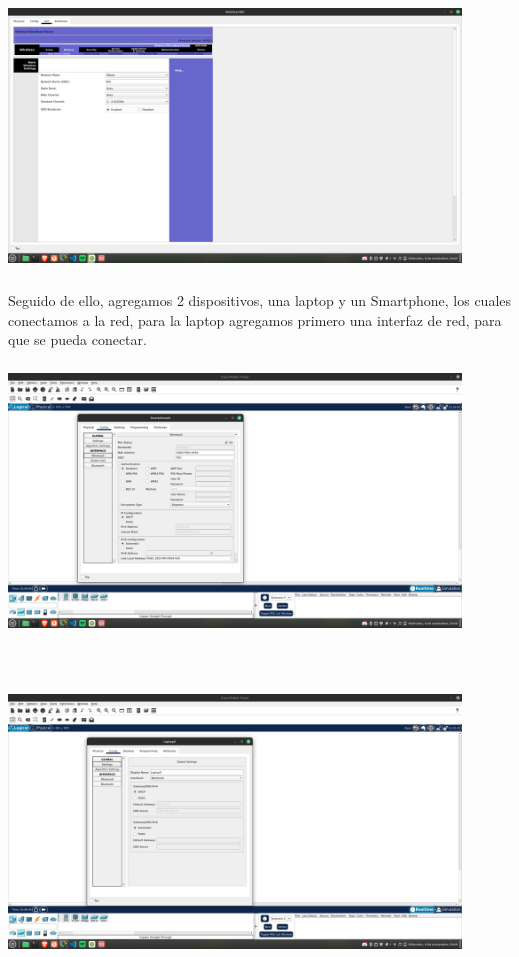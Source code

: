 \documentclass[14pt]{book}
\begin{document}
\includegraphics[width=12cm, height=8cm]{images/ima2.png}\\

Seguido de ello, agregamos 2 dispositivos, una laptop y un Smartphone, los cuales conectamos a la red, para la laptop agregamos primero una interfaz de red, para que se pueda conectar.\\


\includegraphics[width=12cm, height=8cm]{images/ima3.png}

\includegraphics[width=12cm, height=8cm]{images/ima4.png}\\
\end{document}
